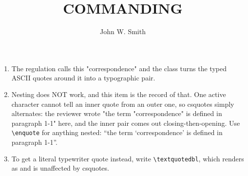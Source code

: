 \documentclass{../armymemo}
\author{John W. Smith}\rank{CPT}\branch{CY}
\title{COMMANDING}
\begin{document}
\begin{enumerate}
	\item The regulation calls this "correspondence" and the class turns the typed ASCII
	      quotes around it into a typographic pair.
	\item Nesting does NOT work, and this item is the record of that. One active character
	      cannot tell an inner quote from an outer one, so csquotes simply alternates: the
	      reviewer wrote "the term "correspondence" is defined in paragraph 1-1" here, and the
	      inner pair comes out closing-then-opening. Use \verb!\enquote! for anything nested:
	      \enquote{the term \enquote{correspondence} is defined in paragraph 1-1}.
	\item To get a literal typewriter quote instead, write \verb!\textquotedbl!, which
	      renders as \textquotedbl{} and is unaffected by csquotes.
\end{enumerate}
\end{document}
